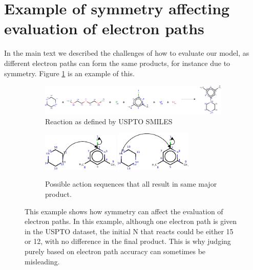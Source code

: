 \section{Example of symmetry affecting evaluation of electron paths}
In the main text we described the challenges of how to evaluate our model, as different electron paths can form the same products, for instance due to symmetry.
Figure \ref{fig:symmetric-reaction-example} is an example of this.


\begin{figure}[h]

    \centering
    \begin{subfigure}[b]{0.95\textwidth}
        \centering
        \includegraphics[width=\textwidth]{imgs/symmetry/main_reaction}
        \caption{Reaction as defined by USPTO SMILES}
    \end{subfigure}
    
    \par\bigskip %
    \begin{subfigure}[b]{0.95\textwidth}
        \centering
        \includegraphics[width=0.4\textwidth]{imgs/symmetry/possible1}
        \qquad
        \qquad
        \includegraphics[width=0.4\textwidth]{imgs/symmetry/possible2}
        \caption{Possible action sequences that all result in same major product.}
    \end{subfigure}
    \caption{This example shows how symmetry can affect the evaluation of electron paths. In this example, although one electron path is given in the USPTO dataset, the initial N that reacts could be either 15 or 12, with no difference in the final product. This is why judging purely based on electron path accuracy can sometimes be misleading.}
    \label{fig:symmetric-reaction-example}
\end{figure}


